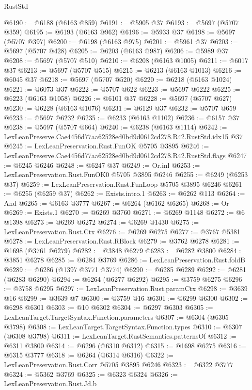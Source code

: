\begin{lexlean}{RustStd}
\begin{coremodule}
@6190 := @6188 (@6163 @859)
@6191 := @5905 @37
@6193 := @5697 (@5707 @359)
@6195 := @6193 (@6163 @962)
@6196 := @5933 @37
@6198 := @5697 (@5707 @397)
@6200 := @6198 (@6163 @975)
@6201 := @5961 @37
@6203 := @5697 (@5707 @428)
@6205 := @6203 (@6163 @987)
@6206 := @5989 @37
@6208 := @5697 (@5707 @510)
@6210 := @6208 (@6163 @1005)
@6211 := @6017 @37
@6213 := @5697 (@5707 @515)
@6215 := @6213 (@6163 @1013)
@6216 := @6045 @37
@6218 := @5697 (@5707 @520)
@6220 := @6218 (@6163 @1024)
@6221 := @6073 @37
@6222 := @5707 @622
@6223 := @5697 @6222
@6225 := @6223 (@6163 @1058)
@6226 := @6101 @37
@6228 := @5697 (@5707 @627)
@6230 := @6228 (@6163 @1076)
@6231 := @6129 @37
@6232 := @5707 @659
@6233 := @5697 @6232
@6235 := @6233 (@6163 @1102)
@6236 := @6157 @37
@6238 := @5697 (@5707 @664)
@6240 := @6238 (@6163 @1114)
@6242 := LexLeanPreserve.Cae4456d77aa62528ed0bd9d0612cd278.R42.RustStd.idx15 @37
@6245 := LexLeanPreservation.Rust.FunOK @5705 @3895
@6246 := LexLeanPreserve.Cae4456d77aa62528ed0bd9d0612cd278.R42.RustStd.flags
@6247 := @6245 @6246
@6248 := @6247 @37
@6249 := Or.inl
@6253 := LexLeanPreservation.Rust.FunOK0 @5705 @3895 @6246
@6255 := @6249 (@6253 @37)
@6259 := LexLeanPreservation.Rust.FunLoop @5705 @3895 @6246
@6261 := @6255 (@6259 @37)
@6262 := Exists.intro.{1}
@6263 := @6262 @113
@6264 := And
@6265 := @6163 @3777
@6267 := @6264 (@6162 @6265)
@6268 := Or
@6269 := Exists.{1}
@6270 := @6269 @3760
@6271 := @6269 @1148
@6272 := @6 @1398
@6273 := @6269 @6272
@6274 := @6269 @1430
@6275 := LexLeanPreservation.Rust.Ctx
@6276 := @6269 @6275
@6277 := @3767 @5381
@6278 := LexLeanPreservation.Rust.RBlock
@6279 := @3762 @6278
@6281 := @1698 (@3761 @6279)
@6282 := @3848 @6279
@6283 := @6282 @3800
@6284 := @3851 @6278
@6285 := @6284 @3769
@6286 := LexLeanPreservation.Rust.foldB
@6289 := @6286 (@1397 @3771 @3774)
@6290 := @6285 @6289
@6292 := @6281 (@6283 @6290)
@6294 := @6264 (@6277 @6292)
@6295 := @3759 @6275
@6296 := @3758 @6295
@6297 := LexLeanPreservation.Rust.paramCtx
@6298 := @3639 @16
@6299 := @3639 @7
@6300 := @3759 @16
@6301 := @6299 @6300
@6302 := @6298 @6301
@6303 := @10 @6302
@6304 := @6297 @6303
@6305 := LexLeanTarget.TargetSyntax.Function.parameters
@6307 := @6304 (@6305 @3798)
@6308 := LexLeanTarget.TargetSyntax.Function.types
@6310 := @6307 (@6308 @3798)
@6311 := LexLeanTarget.RustSemantics.patternsOf
@6312 := @6311 @3800
@6314 := @6296 (@6310 @6312)
@6315 := @1698 @6275
@6316 := @6315 @3777
@6318 := @6264 (@6314 @6316)
@6322 := LexLeanPreservation.Rust.Corr @5705 @3895 @6246
@6323 := @6322 @3777
@6324 := @5362 @3769
@6325 := @6323 @6324
@6326 := LexLeanPreservation.Rust.Jd.b

\end{coremodule}
\end{lexlean}
